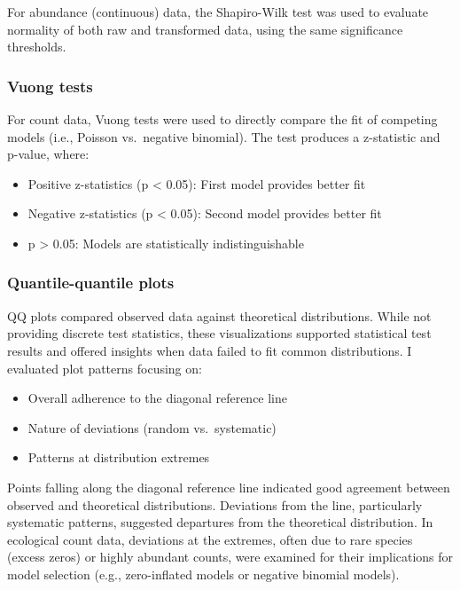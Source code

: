 \documentclass[
  letterpaper,
  DIV=11,
  numbers=noendperiod]{scrartcl}
\begin{document}
For abundance (continuous) data, the Shapiro-Wilk test was used to
evaluate normality of both raw and transformed data, using the same
significance thresholds.

\subsubsection{Vuong tests}\label{vuong-tests}

For count data, Vuong tests were used to directly compare the fit of
competing models (i.e., Poisson vs.~negative binomial). The test
produces a z-statistic and p-value, where:

\begin{itemize}
\item
  Positive z-statistics (p \textless{} 0.05): First model provides
  better fit
\item
  Negative z-statistics (p \textless{} 0.05): Second model provides
  better fit
\item
  p \textgreater{} 0.05: Models are statistically indistinguishable
\end{itemize}

\subsubsection{Quantile-quantile plots}\label{quantile-quantile-plots}

QQ plots compared observed data against theoretical distributions. While
not providing discrete test statistics, these visualizations supported
statistical test results and offered insights when data failed to fit
common distributions. I evaluated plot patterns focusing on:

\begin{itemize}
\item
  Overall adherence to the diagonal reference line
\item
  Nature of deviations (random vs.~systematic)
\item
  Patterns at distribution extremes
\end{itemize}

Points falling along the diagonal reference line indicated good
agreement between observed and theoretical distributions. Deviations
from the line, particularly systematic patterns, suggested departures
from the theoretical distribution. In ecological count data, deviations
at the extremes, often due to rare species (excess zeros) or highly
abundant counts, were examined for their implications for model
selection (e.g., zero-inflated models or negative binomial models).
\end{document}
